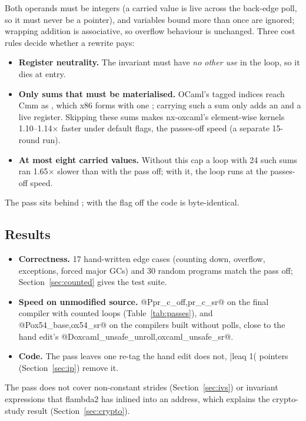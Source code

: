 Both operands must be integers (a carried value is live across the back-edge
poll, so it must never be a pointer), and variables bound more than once are
ignored; wrapping addition is associative, so overflow behaviour is
unchanged. Three cost rules decide whether a rewrite pays:

\begin{itemize}
  \item \textbf{Register neutrality.} The invariant must have \emph{no other
        use} in the loop, so it dies at entry.
  \item \textbf{Only sums that must be materialised.} OCaml's tagged indices
        reach Cmm as , which x86 forms with one
        ; carrying such a sum only adds an  and a live
        register. Skipping these sums makes nx-oxcaml's element-wise kernels
        1.10--1.14$\times$ faster under default flags, the passes-off speed
        (a separate 15-round run).
  \item \textbf{At most eight carried values.} Without this cap a loop with 24
        such sums ran 1.65$\times$ slower than with the pass off; with it, the
        loop runs at the passes-off speed.
\end{itemize}

The pass sits behind ; with the flag off
the code is byte-identical.

\subsection{Results}
\begin{itemize}
  \item \textbf{Correctness.} 17 hand-written edge cases (counting down,
        overflow, exceptions, forced major GCs) and 30 random programs match
        the pass off; Section~\ref{sec:counted} gives the test suite.
  \item \textbf{Speed on unmodified source.} @P{pr_c_off,pr_c_sr}@ on the
        final compiler with counted loops (Table~\ref{tab:passes}), and
        @P{ox54_base,ox54_sr}@ on the compilers built without polls, close to
        the hand edit's @D{oxcaml_unsafe_unroll,oxcaml_unsafe_sr}@.
  \item \textbf{Code.} The pass leaves one re-tag the hand edit does not,
        \ainl|leaq 1(%
        pointers (Section~\ref{sec:ip}) remove it.
\end{itemize}

The pass does not cover non-constant strides (Section~\ref{sec:ivs}) or
invariant expressions that flambda2 has inlined into an address, which
explains the crypto-study result (Section~\ref{sec:crypto}).
